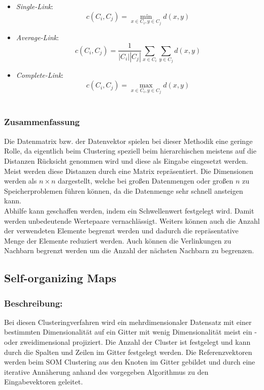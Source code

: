 \begin{itemize}
	\item \textit{Single-Link}:\\
	\[c(C_i,C_j) = \min\limits_{x \in C_i, y \in C_j} d(x,y)\]
		\item \textit{Average-Link}:\\
		\[c(C_i,C_j) = \frac{1}{|C_i||C_j|}\displaystyle\sum_{x \in C_i} \displaystyle\sum_{y \in C_j} d(x,y)\]
		\item \textit{Complete-Link}:\\
		\[c(C_i,C_j) = \max\limits_{x \in C_i, y \in C_j} d(x,y)\]\\
\end{itemize}

\cite{fasulo99, jain99, mitch97}
   
\subsubsection{Zusammenfassung}
Die Datenmatrix bzw. der Datenvektor spielen bei dieser Methodik eine geringe Rolle, da eigentlich beim Clustering speziell beim hierarchischen meistens auf die Distanzen Rücksicht genommen wird und diese als Eingabe eingesetzt werden. Meist werden diese Distanzen durch eine Matrix repräsentiert.  Die Dimensionen werden als \(n \times n\) dargestellt, welche bei großen Datenmengen oder großen \(n\) zu Speicherproblemen führen können, da die Datenmenge sehr schnell ansteigen kann. \\
Abhilfe kann geschaffen werden, indem ein Schwellenwert festgelegt wird. Damit werden unbedeutende Wertepaare vernachlässigt. Weiters können auch die Anzahl der verwendeten Elemente begrenzt werden und dadurch die repräsentative Menge der Elemente reduziert werden. Auch können die Verlinkungen zu Nachbarn begrenzt werden um die Anzahl der nächsten Nachbarn zu begrenzen. \\


\subsection{Self-organizing Maps}
\subsubsection{Beschreibung:}
Bei diesen Clusteringverfahren wird ein mehrdimensionaler Datensatz mit einer bestimmten Dimensionalität auf ein Gitter mit wenig Dimensionalität meist ein - oder zweidimensional projiziert. Die Anzahl der Cluster ist festgelegt und kann durch die Spalten und Zeilen im Gitter festgelegt werden. Die Referenzvektoren werden beim SOM Clustering aus den Knoten im Gitter gebildet und durch eine iterative Annäherung anhand des vorgegeben Algorithmus zu den Eingabevektoren geleitet.   \cite{tam99}
